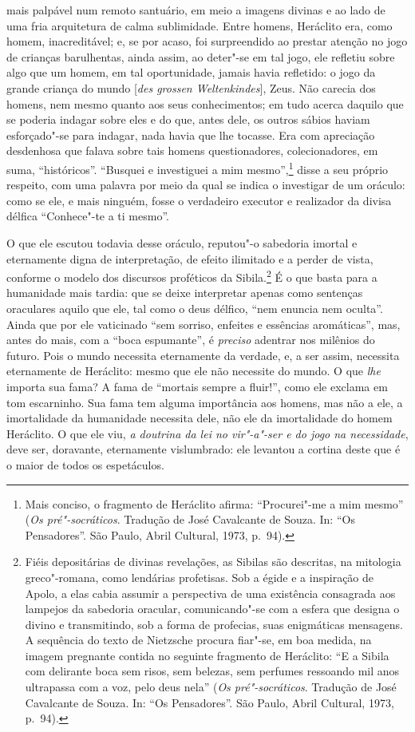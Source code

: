 mais palpável num remoto santuário, em meio a imagens divinas e ao lado
de uma fria arquitetura de calma sublimidade. Entre homens, Heráclito
era, como homem, inacreditável; e, se por acaso, foi surpreendido ao
prestar atenção no jogo de crianças barulhentas, ainda assim, ao
deter"-se em tal jogo, ele refletiu sobre algo que um homem, em tal
oportunidade, jamais havia refletido: o jogo da grande criança do mundo
[\textit{des grossen Weltenkindes}], Zeus. Não carecia dos homens, nem
mesmo quanto aos seus conhecimentos; em tudo acerca daquilo que se
poderia indagar sobre eles e do que, antes dele, os outros sábios
haviam esforçado"-se para indagar, nada havia que lhe tocasse. Era com
apreciação desdenhosa que falava sobre tais homens questionadores,
colecionadores, em suma, ``históricos''. ``Busquei e investiguei a mim
mesmo'',\footnote{ Mais conciso, o fragmento de Heráclito afirma:
``Procurei"-me a mim mesmo'' (\textit{Os pré"-socráticos}. Tradução de José
Cavalcante de Souza. In: ``Os Pensadores''. São Paulo, Abril Cultural,
1973, p.~94).} disse a seu próprio respeito, com uma palavra por
meio da qual se indica o investigar de um oráculo: como se ele, e mais
ninguém, fosse o verdadeiro executor e realizador da divisa délfica
``Conhece"-te a ti mesmo''.

O que ele escutou todavia desse oráculo, reputou"-o sabedoria imortal e
eternamente digna de interpretação, de efeito ilimitado e a perder de
vista, conforme o modelo dos discursos proféticos da Sibila.\footnote{ Fiéis 
depositárias de divinas revelações, as Sibilas são descritas, na
mitologia greco"-romana, como lendárias profetisas. Sob a égide e a
inspiração de Apolo, a elas cabia assumir a perspectiva de uma
existência consagrada aos lampejos da sabedoria oracular,
comunicando"-se com a esfera que designa o divino e transmitindo, sob a
forma de profecias, suas enigmáticas mensagens. A sequência do texto de
Nietzsche procura fiar"-se, em boa medida, na imagem pregnante contida
no seguinte fragmento de Heráclito: ``E a Sibila com delirante boca sem
risos, sem belezas, sem perfumes ressoando mil anos ultrapassa com a
voz, pelo deus nela'' (\textit{Os pré"-socráticos}. Tradução de José
Cavalcante de Souza. In: ``Os Pensadores''. São Paulo, Abril Cultural,
1973, p.~94).} É o que basta para a humanidade mais tardia: que
se deixe interpretar apenas como sentenças oraculares aquilo que ele,
tal como o deus délfico, ``nem enuncia nem oculta''. Ainda que por ele
vaticinado ``sem sorriso, enfeites e essências aromáticas'', mas, antes
do mais, com a ``boca espumante'', é \textit{preciso} adentrar nos
milênios do futuro. Pois o mundo necessita eternamente da verdade, e, a
ser assim, necessita eternamente de Heráclito: mesmo que ele não
necessite do mundo. O que \textit{lhe} importa sua fama? A fama de
``mortais sempre a fluir!'', como ele exclama em tom escarninho. Sua fama
tem alguma importância aos homens, mas não a ele, a imortalidade da
humanidade necessita dele, não ele da imortalidade do homem Heráclito.
O que ele viu, \textit{a doutrina da lei no vir"-a"-ser e do jogo na
necessidade}, deve ser, doravante, eternamente vislumbrado: ele
levantou a cortina deste que é o maior de todos os espetáculos.

